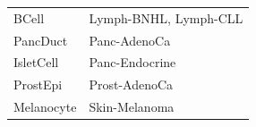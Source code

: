 \begin{figure}[h!]
\begin{minipage}[c]{\textwidth}
\begin{tabulary}{\textwidth}{ ll }
    BCell & Lymph-BNHL, Lymph-CLL \\
    
    PancDuct & Panc-AdenoCa \\
    
    IsletCell & Panc-Endocrine \\
    
    ProstEpi & Prost-AdenoCa \\
    
    Melanocyte & Skin-Melanoma \\
    \bottomrule
    
    \end{tabulary}
    
  \end{minipage}\hfill
  \vspace{0.9cm}
  
  \begin{minipage}[c]{\textwidth}
    \caption{
    } \label{fig:encode_pca}
  \end{minipage}
\end{figure}
